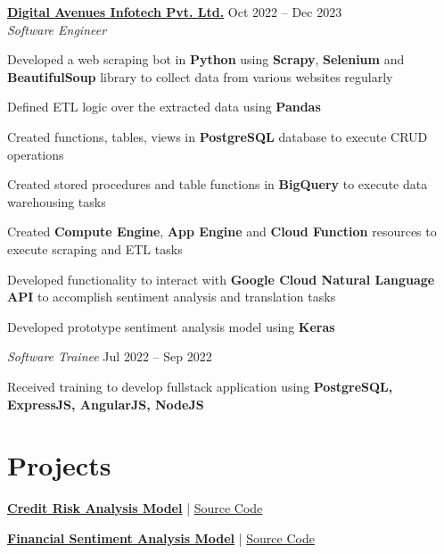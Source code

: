\documentclass[a4paper,10pt]{article}
\begin{document}
\textbf{\href{https://www.digitalavenues.com}{Digital Avenues Infotech Pvt. Ltd.}} \hfill Oct 2022 -- Dec 2023\\
\textit{Software Engineer}
\begin{experiencelist}
\item Developed a web scraping bot in \textbf{Python} using \textbf{Scrapy}, \textbf{Selenium} and \textbf{BeautifulSoup} library to collect data from various websites regularly
\item Defined ETL logic over the extracted data using \textbf{Pandas}
\item Created functions, tables, views in \textbf{PostgreSQL} database to execute CRUD operations
\item Created stored procedures and table functions in \textbf{BigQuery} to execute data warehousing tasks
\item Created \textbf{Compute Engine}, \textbf{App Engine} and \textbf{Cloud Function} resources to execute scraping and ETL tasks
\item Developed functionality to interact with \textbf{Google Cloud Natural Language API} to accomplish sentiment analysis and translation tasks
\item Developed prototype sentiment analysis model using \textbf{Keras}
\end{experiencelist}


\textit{Software Trainee} \hfill Jul 2022 -- Sep 2022
\begin{experiencelist}
\item Received training to develop fullstack application using \textbf{PostgreSQL, ExpressJS, AngularJS, NodeJS}
\end{experiencelist}

\section*{Projects}
\begin{experiencelist}
\item \textbf{\href{https://credit-risk-predictor-rhwr.onrender.com/}{Credit Risk Analysis Model}} | \href{https://github.com/soumyadipnayak/summerschool2026/blob/main/models/credit_risk_analysis.ipynb}{Source Code}
\item \textbf{\href{https://1drv.ms/p/c/53c938a49db73b7f/IQApVodIiWXlTIKawG_rkJ_IAXPO01S7s7XnExXHszq200s}{Financial Sentiment Analysis Model}} | \href{https://github.com/soumyadipnayak/summerschool2026/blob/main/deep_learning/sentiment_analysis.ipynb}{Source Code}
\end{experiencelist}
\end{document}
